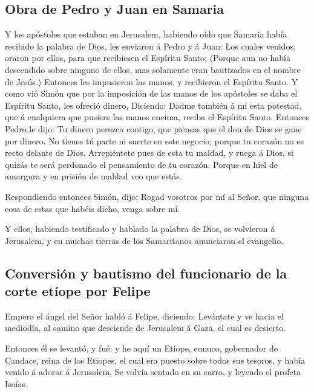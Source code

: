 \hypertarget{obra-de-pedro-y-juan-en-samaria}{%
\subsection{Obra de Pedro y Juan en
Samaria}\label{obra-de-pedro-y-juan-en-samaria}}

 Y los apóstoles que estaban en Jerusalem, habiendo oído
que Samaria había recibido la palabra de Dios, les enviaron á Pedro y á
Juan:  Los cuales venidos, oraron por ellos, para que
recibiesen el Espíritu Santo;  (Porque aun no había
descendido sobre ninguno de ellos, mas solamente eran bautizados en el
nombre de Jesús.)  Entonces les impusieron las manos, y
recibieron el Espíritu Santo.  Y como vió Simón que por la
imposición de las manos de los apóstoles se daba el Espíritu Santo, les
ofreció dinero,  Diciendo: Dadme también á mí esta
potestad, que á cualquiera que pusiere las manos encima, reciba el
Espíritu Santo.  Entonces Pedro le dijo: Tu dinero perezca
contigo, que piensas que el don de Dios se gane por dinero.
 No tienes tú parte ni suerte en este negocio; porque tu
corazón no es recto delante de Dios.  Arrepiéntete pues de
esta tu maldad, y ruega á Dios, si quizás te será perdonado el
pensamiento de tu corazón.  Porque en hiel de amargura y en
prisión de maldad veo que estás.

 Respondiendo entonces Simón, dijo: Rogad vosotros por mí
al Señor, que ninguna cosa de estas que habéis dicho, venga sobre mí.

 Y ellos, habiendo testificado y hablado la palabra de
Dios, se volvieron á Jerusalem, y en muchas tierras de los Samaritanos
anunciaron el evangelio.

\hypertarget{conversiuxf3n-y-bautismo-del-funcionario-de-la-corte-etuxedope-por-felipe}{%
\subsection{Conversión y bautismo del funcionario de la corte etíope por
Felipe}\label{conversiuxf3n-y-bautismo-del-funcionario-de-la-corte-etuxedope-por-felipe}}

 Empero el ángel del Señor habló á Felipe, diciendo:
Levántate y ve hacia el mediodía, al camino que desciende de Jerusalem á
Gaza, el cual es desierto.

 Entonces él se levantó, y fué: y he aquí un Etiope,
eunuco, gobernador de Candace, reina de los Etiopes, el cual era puesto
sobre todos sus tesoros, y había venido á adorar á Jerusalem,
 Se volvía sentado en su carro, y leyendo el profeta
Isaías.

